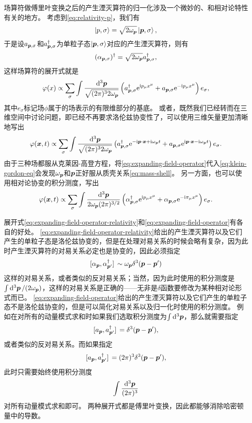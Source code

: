 场算符做傅里叶变换之后的产生湮灭算符的归一化涉及一个微妙的、和相对论特性有关的地方。
考虑到\eqref{eq:relativity-p}，我们有
\[
    \ket{p, \sigma} = \sqrt{2 \omega_{\vb*{p}}} \ket{\vb*{p}, \sigma},
\]
于是设${a}_{\vb*{p}, \sigma}$和${a}^\dagger_{\vb*{p}, \sigma}$为单粒子态$\ket{\vb*{p}, \sigma}$对应的产生湮灭算符，则有
\[
    ({\alpha}_{\vb*{p}, \sigma})^\dagger = \sqrt{2\omega_{\vb*{p}}} {a}_{\vb*{p}, \sigma}^\dagger,
\]
这样场算符的展开式就是
\[
    {\varphi}(x) \propto \sum_\sigma \int \frac{\dd[3]{\vb*{p}}}{\sqrt{(2\pi)^3 2 \omega_{\vb*{p}}}} \left( {a}^\dagger_{\vb*{p}, \sigma} \mathrm{e}^{\mathrm{i} p_\mu x^\mu} + {a}_{\vb*{p}, \sigma} \mathrm{e}^{- \mathrm{i} p_\mu x^\mu} \right) e_\sigma,
\]
其中$e_\sigma$标记场$\phi$属于的场表示的有限维部分的基底。
或者，既然我们已经转而在三维空间中讨论问题，即已经不再要求洛伦兹协变性了，可以使用三维矢量更加清晰地写出
\begin{equation}
    {\varphi}(\vb*{x}, t) \propto \sum_\sigma \int \frac{\dd[3]{\vb*{p}}}{\sqrt{(2\pi)^3 2 \omega_{\vb*{p}}}} \left( {a}^\dagger_{\vb*{p}, \sigma} \mathrm{e}^{- \mathrm{i} \vb*{p} \cdot \vb*{x} + \mathrm{i} \omega_{\vb*{p}} t} + {a}_{\vb*{p}, \sigma} \mathrm{e}^{\mathrm{i} \vb*{p} \cdot \vb*{x} - \mathrm{i} \omega_{\vb*{p}} t} \right) e_\sigma. 
    \label{eq:expanding-field-operator}
\end{equation}
由于三种场都服从克莱因-高登方程，将\eqref{eq:expanding-field-operator}代入\eqref{eq:klein-gordon-eq}会发现$\omega_{\vb*{p}}$和$\vb*{p}$正好服从质壳关系\eqref{eq:mass-shell}。
另一方面，也可以使用相对论协变的积分测度，写出
\begin{equation}
    {\varphi}(\vb*{x}, t) \propto \sum_\sigma \int \frac{\dd[3]{\vb*{p}}}{2 \omega_{\vb*{p}} (2\pi)^{3/2}} \left( {\alpha}^\dagger_{\vb*{p}, \sigma} \mathrm{e}^{ \mathrm{i} p_\mu x^\mu} + {\alpha}_{\vb*{p}, \sigma} \mathrm{e}^{- \mathrm{i} \pi_\mu x^\mu} \right) e_\sigma. 
    \label{eq:expanding-field-operator-relativity}
\end{equation}

展开式\eqref{eq:expanding-field-operator-relativity}和\eqref{eq:expanding-field-operator}有各自的好处。
\eqref{eq:expanding-field-operator-relativity}给出的产生湮灭算符以及它们产生的单粒子态是洛伦兹协变的，但是在处理对易关系的时候会略有复杂，因为此时产生湮灭算符的对易关系必定也是协变的，因此必须指定
\[
    \comm*{{\alpha}_{\vb*{p}}}{{\alpha}^\dagger_{\vb*{p}'}} \sim \omega_{\vb*{p}} \delta^3 (\vb*{p} - \vb*{p}')
\]
这样的对易关系，或者类似的反对易关系；当然，因为此时使用的积分测度是$\int \dd[3]{\vb*{p}} / (2 \omega_{\vb*{p}})$，这样的对易关系是正确的——无非是$\delta$函数要修改为某种相对论形式而已。
\eqref{eq:expanding-field-operator}给出的产生湮灭算符以及它们产生的单粒子态不是洛伦兹协变的，但是可以简化对易关系以及归一化时使用的积分测度。
例如在对所有的动量模式求和时如果我们选取积分测度为$\int \dd[3]{\vb*{p}}$，那么就需要指定
\[
    \comm*{{a}_{\vb*{p}}}{{a}^\dagger_{\vb*{p}'}} = \delta^3 (\vb*{p} - \vb*{p}'),
\]
或者类似的反对易关系。而如果指定
\[
    \comm*{{a}_{\vb*{p}}}{{a}^\dagger_{\vb*{p}'}} = (2\pi)^3 \delta^3 (\vb*{p} - \vb*{p}'),
\]
此时只需要始终使用积分测度
\[
    \int \frac{\dd[3]{\vb*{p}}}{(2\pi)^3}
\]
对所有动量模式求和即可。
两种展开式都是傅里叶变换，因此都能够消除哈密顿量中的导数。

